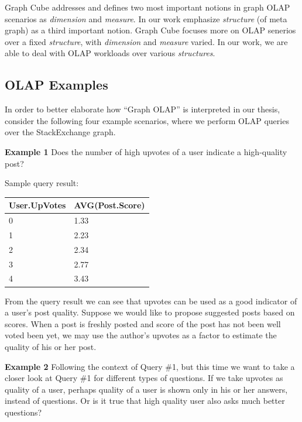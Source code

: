  Graph Cube \cite{DBLP:conf/sigmod/ZhaoLXH11}  addresses and defines two most important notions in graph OLAP scenarios as \textit{dimension} and \textit{measure}. In our work emphasize \textit{structure} (of meta graph) as a third important notion. Graph Cube \cite{DBLP:conf/sigmod/ZhaoLXH11} focuses more on OLAP senerios over a fixed \textit{structure}, with \textit{dimension} and \textit{measure} varied. %
 In our work, we are able to deal with OLAP workloads over various \textit{structures}.


\subsection{OLAP Examples}
\label{OLAPExamples}
 In order to better elaborate how ``Graph OLAP'' is interpreted in our thesis, consider the following four example scenarios, where we perform OLAP queries over the StackExchange graph.

\noindent\textbf{Example 1} Does the number of high upvotes of a user indicate a high-quality post?


Sample query result:
\begin {center}
\begin{tabular}{ l l }
	User.UpVotes&AVG(Post.Score)\\\hline
	0&1.33\\
	1&2.23\\
	2&2.34\\
	3&2.77\\
	4&3.43\\\hline
\end{tabular}
\end {center}

From the query result we can see that upvotes can be used as a good indicator of a user’s post quality. Suppose we would like to propose suggested posts based on scores. When a post is freshly posted and score of the post has not been well voted been yet, we may use the author’s upvotes as a factor to estimate the quality of his or her post.

\noindent\textbf{Example 2} Following the context of Query \#1, but this time we want to take a closer look at Query \#1 for different types of questions. If we take upvotes as quality of a user, perhaps quality of a user is shown only in his or her answers, instead of questions. Or is it true that high quality user also asks much better questions?


